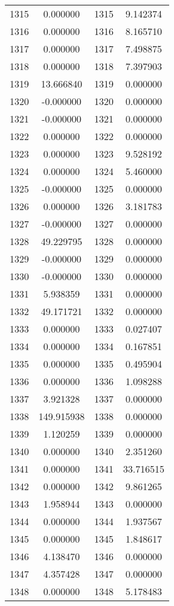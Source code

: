 \documentclass[12pt]{article}
\begin{document}
\begin{longtable}{@{}cccc@{}}
1315 & 0.000000 & 1315 & 9.142374 \\
1316 & 0.000000 & 1316 & 8.165710 \\
1317 & 0.000000 & 1317 & 7.498875 \\
1318 & 0.000000 & 1318 & 7.397903 \\
1319 & 13.666840 & 1319 & 0.000000 \\
1320 & -0.000000 & 1320 & 0.000000 \\
1321 & -0.000000 & 1321 & 0.000000 \\
1322 & 0.000000 & 1322 & 0.000000 \\
1323 & 0.000000 & 1323 & 9.528192 \\
1324 & 0.000000 & 1324 & 5.460000 \\
1325 & -0.000000 & 1325 & 0.000000 \\
1326 & 0.000000 & 1326 & 3.181783 \\
1327 & -0.000000 & 1327 & 0.000000 \\
1328 & 49.229795 & 1328 & 0.000000 \\
1329 & -0.000000 & 1329 & 0.000000 \\
1330 & -0.000000 & 1330 & 0.000000 \\
1331 & 5.938359 & 1331 & 0.000000 \\
1332 & 49.171721 & 1332 & 0.000000 \\
1333 & 0.000000 & 1333 & 0.027407 \\
1334 & 0.000000 & 1334 & 0.167851 \\
1335 & 0.000000 & 1335 & 0.495904 \\
1336 & 0.000000 & 1336 & 1.098288 \\
1337 & 3.921328 & 1337 & 0.000000 \\
1338 & 149.915938 & 1338 & 0.000000 \\
1339 & 1.120259 & 1339 & 0.000000 \\
1340 & 0.000000 & 1340 & 2.351260 \\
1341 & 0.000000 & 1341 & 33.716515 \\
1342 & 0.000000 & 1342 & 9.861265 \\
1343 & 1.958944 & 1343 & 0.000000 \\
1344 & 0.000000 & 1344 & 1.937567 \\
1345 & 0.000000 & 1345 & 1.848617 \\
1346 & 4.138470 & 1346 & 0.000000 \\
1347 & 4.357428 & 1347 & 0.000000 \\
1348 & 0.000000 & 1348 & 5.178483 \\

\end{longtable}
\end{document}
